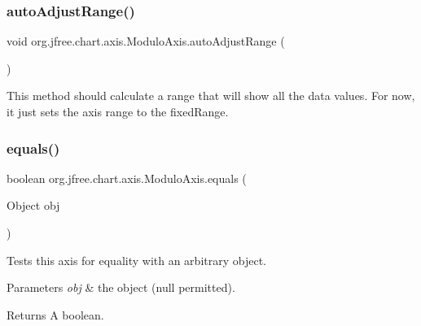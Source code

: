 \subsubsection{\texorpdfstring{auto\+Adjust\+Range()}{autoAdjustRange()}}
{\footnotesize\ttfamily void org.\+jfree.\+chart.\+axis.\+Modulo\+Axis.\+auto\+Adjust\+Range (\begin{DoxyParamCaption}{ }\end{DoxyParamCaption})\hspace{0.3cm}{\ttfamily [protected]}}

This method should calculate a range that will show all the data values. For now, it just sets the axis range to the fixed\+Range. \mbox{\label{classorg_1_1jfree_1_1chart_1_1axis_1_1_modulo_axis_a8cbf0b046bffac08a9ceea2ddf60ea50}} 
\subsubsection{\texorpdfstring{equals()}{equals()}}
{\footnotesize\ttfamily boolean org.\+jfree.\+chart.\+axis.\+Modulo\+Axis.\+equals (\begin{DoxyParamCaption}\item[{Object}]{obj }\end{DoxyParamCaption})}

Tests this axis for equality with an arbitrary object.


\begin{DoxyParams}{Parameters}
{\em obj} & the object ({\ttfamily null} permitted).\\
\hline
\end{DoxyParams}
\begin{DoxyReturn}{Returns}
A boolean. 
\end{DoxyReturn}
\mbox{\label{classorg_1_1jfree_1_1chart_1_1axis_1_1_modulo_axis_af16d9c2b4eecb8d0f64e2155e7d57d91}} 
